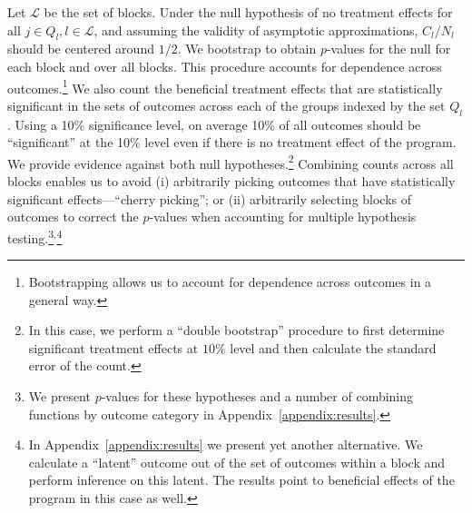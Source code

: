 Let $\mathcal{L}$ be the set of blocks. Under the null hypothesis of no treatment effects for all $j \in Q_l, l \in \mathcal{L}$, and assuming the validity of asymptotic approximations, $C_l / N_l$ should be centered around $1/2$. We bootstrap to obtain $p$-values for the null for each block and over all blocks. This procedure accounts for dependence across outcomes.\footnote{Bootstrapping allows us to account for dependence across outcomes in a general way.} We also count the beneficial treatment effects that are statistically significant in the sets of outcomes across each of the groups indexed by the set $Q_l$. Using a 10\% significance level, on average 10\% of all outcomes should be ``significant'' at the 10\% level even if there is no treatment effect of the program. We provide evidence against both null hypotheses.\footnote{In this case, we perform a ``double bootstrap'' procedure to first determine significant treatment effects at $10\%$ level and then calculate the standard error of the count.} Combining counts across all blocks enables us to avoid (i) arbitrarily picking outcomes that have statistically significant effects---``cherry picking''; or (ii) arbitrarily selecting blocks of outcomes to correct the $p$-values when accounting for multiple hypothesis testing.\footnote{We present $p$-values for these hypotheses and a number of combining functions by outcome category in Appendix~\ref{appendix:results}.}$^{\text{,}}$\footnote{In Appendix~\ref{appendix:results} we present yet another alternative. We calculate a ``latent'' outcome out of the set of outcomes within a block and perform inference on this latent. The results point to beneficial effects of the program in this case as well.}
